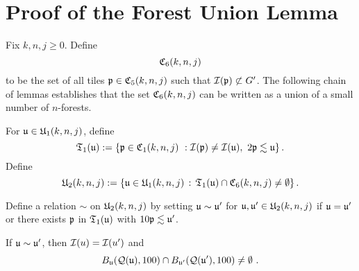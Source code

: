 \section{Proof of the Forest Union Lemma}
\label{subsecforest}

Fix $k,n,j\ge 0$.
Define
$$
    {\mathfrak C}_6(k,n,j)
$$
to be the set of all tiles ${\mathfrak p} \in {\mathfrak C}_5(k,n,j)$ such that ${\mathcal{I}}({\mathfrak p}) \not\subset G'$. The following chain of lemmas
establishes that the set ${\mathfrak C}_6(k,n,j)$ can be written as a union of a small number of $n$-forests.

For ${\mathfrak u}\in {\mathfrak U}_1(k,n,j)$, define
\begin{equation}
    \label{eq-T1-def}
    \mathfrak{T}_1({\mathfrak u}):= \{{\mathfrak p} \in {\mathfrak C}_1(k,n,j) \ : {\mathcal{I}}({\mathfrak p})\neq {\mathcal{I}}({\mathfrak u}), \ 2{\mathfrak p} \lesssim {\mathfrak u}\}\,.
\end{equation}
Define
\begin{equation}
    \label{eq-U2-def}
    {\mathfrak U}_2(k,n,j) := \{ {\mathfrak u} \in {\mathfrak U}_1(k,n,j) \, : \, \mathfrak{T}_1({\mathfrak u}) \cap {\mathfrak C}_6(k,n,j) \ne \emptyset\}\,.
\end{equation}

Define a relation $\sim$ on ${\mathfrak U}_2(k,n,j)$
by setting ${\mathfrak u}\sim {\mathfrak u}'$
for ${\mathfrak u},{\mathfrak u}'\in {\mathfrak U}_2(k,n,j)$
if ${\mathfrak u}={\mathfrak u}'$ or there exists ${\mathfrak p}$ in $\mathfrak{T}_1({\mathfrak u})$
with $10 {\mathfrak p}\lesssim {\mathfrak u}'$.

\begin{lemma}
    \label{relation-geometry}
    \leanok
    If ${\mathfrak u} \sim {\mathfrak u}'$, then ${\mathcal{I}}(u) = {\mathcal{I}}(u')$ and
    \begin{equation*}
        B_{{\mathfrak u}}({\mathcal{Q}}({\mathfrak u}), 100) \cap B_{{\mathfrak u}'}({\mathcal{Q}}({\mathfrak u}'), 100) \neq \emptyset\ .
    \end{equation*}
\end{lemma}

